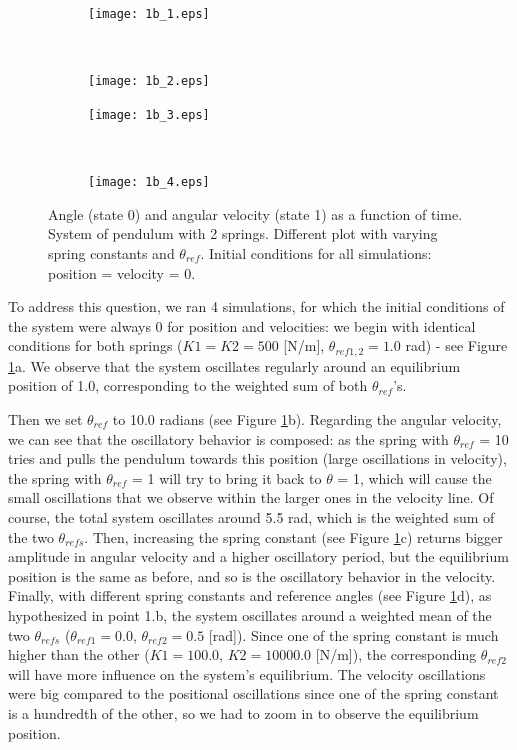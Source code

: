 \documentclass{cmc}
\begin{document}
\begin{figure}[H]
    \centering
    \begin{subfigure}[b]{0.5\textwidth}
        \centering
        \texttt{[image: 1b\_1.eps]}
        \caption{}
    \end{subfigure}%
    ~
    \begin{subfigure}[b]{0.5\textwidth}
        \centering
        \texttt{[image: 1b\_2.eps]}
        \caption{}
    \end{subfigure}
    \bigskip
    \begin{subfigure}[b]{0.5\textwidth}
        \centering
        \texttt{[image: 1b\_3.eps]}
        \caption{}
    \end{subfigure}%
    ~
    \begin{subfigure}[b]{0.5\textwidth}
        \centering
        \texttt{[image: 1b\_4.eps]}
        \caption{}
    \end{subfigure}
    \caption{Angle (state 0) and angular velocity (state 1) as a function of time.  System of pendulum with 2 springs. Different plot with varying spring constants and $\theta_{ref}$. Initial conditions for all simulations: position = velocity = 0.}
    \label{figure:1b}
\end{figure}

To address this question, we ran 4 simulations, for which the initial conditions of the system were always 0 for position and velocities: we begin with identical conditions for both springs ($K1 = K2 = 500$ [N/m], $\theta_{ref1,2}=1.0$ rad) - see Figure \ref{figure:1b}a. We observe that the system oscillates regularly around an equilibrium position of 1.0, corresponding to the weighted sum of both $\theta_{ref}$'s.

Then we set $\theta_{ref}$ to 10.0 radians (see Figure \ref{figure:1b}b). Regarding the angular velocity, we can see that the oscillatory behavior is composed: as the spring with $\theta_{ref}$ = 10 tries and pulls the pendulum towards this position (large oscillations in velocity), the spring with $\theta_{ref}$ = 1 will try to bring it back to $\theta$ = 1, which will cause the small oscillations that we observe within the larger ones in the velocity line. Of course, the total system oscillates around 5.5 rad, which is the weighted sum of the two $\theta_{refs}$. Then, increasing the spring constant (see Figure \ref{figure:1b}c) returns bigger amplitude in angular velocity and a higher oscillatory period, but the equilibrium position is the same as before, and so is the oscillatory behavior in the velocity. Finally, with different spring constants and reference angles (see Figure \ref{figure:1b}d), as hypothesized in point 1.b, the system oscillates around a weighted mean of the two $\theta_{refs}$ ($\theta_{ref1} = 0.0$, $\theta_{ref2} = 0.5$ [rad]). Since one of the spring constant is much higher than the other ($K1 = 100.0$, $K2 = 10000.0$ [N/m]), the corresponding $\theta_{ref2}$ will have more influence on the system's equilibrium. The velocity oscillations were big compared to the positional oscillations since one of the spring constant is a hundredth of the other, so we had to zoom in to observe the equilibrium position.
\end{document}
